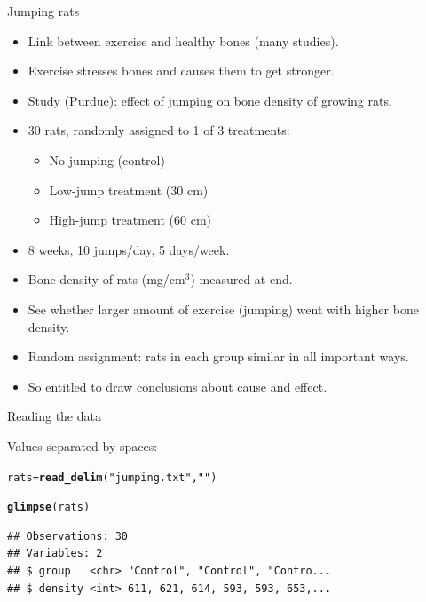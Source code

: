 \documentclass[unknownkeysallowed]{beamer}\usepackage[]{graphicx}\usepackage[]{color}
\makeatletter
\newcommand{\hlstr}[1]{\textcolor[rgb]{0.192,0.494,0.8}{#1}}%
\newcommand{\hlstd}[1]{\textcolor[rgb]{0.345,0.345,0.345}{#1}}%
\newcommand{\hlkwb}[1]{\textcolor[rgb]{0.69,0.353,0.396}{#1}}%
\newcommand{\hlkwd}[1]{\textcolor[rgb]{0.737,0.353,0.396}{\textbf{#1}}}%
\newenvironment{kframe}{%
 \def\at@end@of@kframe{}%
 \ifinner\ifhmode%
  \def\at@end@of@kframe{\end{minipage}}%
  \begin{minipage}{\columnwidth}%
 \fi\fi%
 \def\FrameCommand##1{\hskip\@totalleftmargin \hskip-\fboxsep
 \colorbox{shadecolor}{##1}\hskip-\fboxsep
     \hskip-\linewidth \hskip-\@totalleftmargin \hskip\columnwidth}%
 \MakeFramed {\advance\hsize-\width
   \@totalleftmargin\z@ \linewidth\hsize
   \@setminipage}}%
 {\par\unskip\endMakeFramed%
 \at@end@of@kframe}
\newenvironment{knitrout}{}{} %
\makeatother
\begin{document}
\begin{frame}[fragile]{Jumping rats}

  \begin{itemize}
\item Link between exercise and healthy bones (many studies).
\item Exercise stresses bones and causes them to get stronger.
\item Study (Purdue): effect of jumping on bone density of growing rats.
\item 30 rats, randomly assigned to 1 of 3 treatments:
  \begin{itemize}
  \item No jumping (control)
  \item Low-jump treatment (30 cm)
  \item High-jump treatment (60 cm)
  \end{itemize}
\item 8 weeks, 10 jumps/day, 5 days/week.
\item Bone density of rats (mg/cm$^3$) measured at end.
  \item See whether larger amount of exercise (jumping) went with
    higher bone density.
  \item Random assignment: rats in each group similar in all important
    ways.
  \item So entitled to draw conclusions about cause and effect.

  \end{itemize}

  
\end{frame}

\begin{frame}[fragile]{Reading the data}
  
  Values separated by spaces:
\begin{knitrout}
\color{fgcolor}\begin{kframe}
\begin{alltt}
\hlstd{rats}\hlkwb{=}\hlkwd{read_delim}\hlstd{(}\hlstr{"jumping.txt"}\hlstd{,}\hlstr{" "}\hlstd{)}
\end{alltt}


{\ttfamily\noindent\itshape\color{messagecolor}{\#\# Parsed with column specification:\\\#\# cols(\\\#\#\ \  group = col\_character(),\\\#\#\ \  density = col\_integer()\\\#\# )}}\begin{alltt}
\hlkwd{glimpse}\hlstd{(rats)}
\end{alltt}
\begin{verbatim}
## Observations: 30
## Variables: 2
## $ group   <chr> "Control", "Control", "Contro...
## $ density <int> 611, 621, 614, 593, 593, 653,...
\end{verbatim}
\end{kframe}
\end{knitrout}
  
\end{frame}
\end{document}

